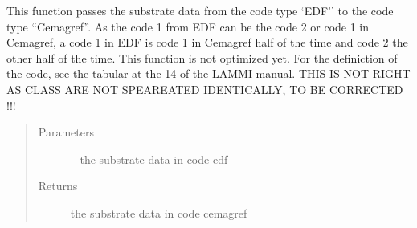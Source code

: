 \documentclass[letterpaper,10pt,english]{sphinxmanual}
\begin{document}

\begin{fulllineitems}
\label{\detokenize{index:src.substrate.edf_to_cemagref}}
This function passes the substrate data from the code type `EDF'' to the code type ``Cemagref''. As the code 1 from EDF
can be the code 2 or code 1 in Cemagref, a code 1 in EDF is code 1 in Cemagref half of the time and code 2 the
other half of the time. This function is not optimized yet. For the definiction of the code, see the tabular at the 14
of the LAMMI manual. THIS IS NOT RIGHT AS CLASS ARE NOT SPEAREATED IDENTICALLY,  TO BE CORRECTED !!!
\begin{quote}\begin{description}
\item[{Parameters}] \leavevmode
{} -- the substrate data in code edf

\item[{Returns}] \leavevmode
the substrate data in code cemagref

\end{description}\end{quote}

\end{fulllineitems}

\end{document}
